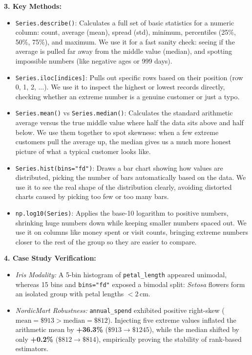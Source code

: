 \documentclass[11pt,a4paper]{article}
\begin{document}
\vspace{0.4em}
\noindent\textbf{3. Key Methods:}\par\vspace{0.2em}
\begin{itemize}[leftmargin=*]
    \item \lstinline!Series.describe()!: Calculates a full set of basic statistics for a numeric column: count, average (mean), spread (std), minimum, percentiles (25\%, 50\%, 75\%), and maximum. We use it for a fast sanity check: seeing if the average is pulled far away from the middle value (median), and spotting impossible numbers (like negative ages or 999 days).
    \item \lstinline!Series.iloc[indices]!: Pulls out specific rows based on their position (row 0, 1, 2, ...). We use it to inspect the highest or lowest records directly, checking whether an extreme number is a genuine customer or just a typo.
    \item \lstinline!Series.mean()! vs \lstinline!Series.median()!: Calculates the standard arithmetic average versus the true middle value where half the data sits above and half below. We use them together to spot skewness: when a few extreme customers pull the average up, the median gives us a much more honest picture of what a typical customer looks like.
    \item \lstinline!Series.hist(bins="fd")!: Draws a bar chart showing how values are distributed, picking the number of bars automatically based on the data. We use it to see the real shape of the distribution clearly, avoiding distorted charts caused by picking too few or too many bars.
    \item \lstinline!np.log10(Series)!: Applies the base-10 logarithm to positive numbers, shrinking huge numbers down while keeping smaller numbers spaced out. We use it on columns like money spent or visit counts, bringing extreme numbers closer to the rest of the group so they are easier to compare.
\end{itemize}

\vspace{0.4em}
\noindent\textbf{4. Case Study Verification:}\par\vspace{0.2em}
\begin{itemize}[leftmargin=*]
    \item \textit{Iris Modality:} A 5-bin histogram of \lstinline!petal_length! appeared unimodal, whereas 15 bins and \lstinline!bins="fd"! exposed a bimodal split: \textit{Setosa} flowers form an isolated group with petal lengths $< 2\,\text{cm}$.
    \item \textit{NordicMart Robustness:} \lstinline!annual_spend! exhibited positive right-skew ($\text{mean} = \$913 > \text{median} = \$812$). Injecting five extreme values inflated the arithmetic mean by \textbf{+36.3\%} ($\$913 \to \$1245$), while the median shifted by only \textbf{+0.2\%} ($\$812 \to \$814$), empirically proving the stability of rank-based estimators.
\end{itemize}
\end{document}
